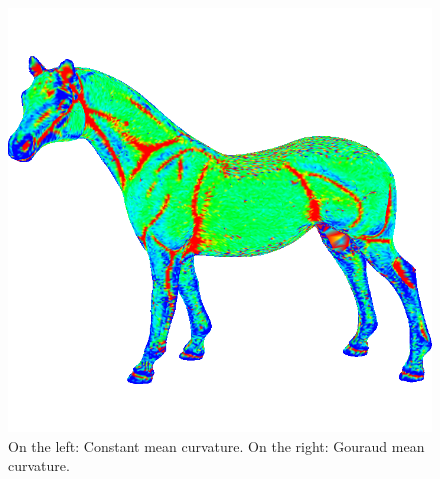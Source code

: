 \begin{figure}[!h]
    \includegraphics[scale=0.42]{images/horse-mcv.png}
    \endminipage\hfill
    \caption{On the left: Constant mean curvature. On the right: Gouraud mean curvature.}
    \label{fig:comparison-mce-mcv}
\end{figure}